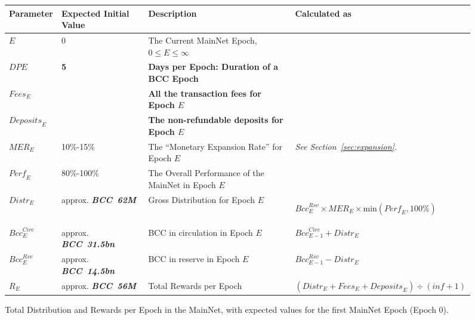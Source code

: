 \documentclass[11pt,a4paper,dvipsnames,twosided,final]{article}
\newcommand{\bcc}{BCC{}}
\newcommand{\BCC}[1]{\textbf{\emph{\bcc~{#1}}}}
\newcommand{\bcc}[1]{Bcc}
\begin{document}
\begin{figure}[h!]
\begin{center}
\begin{tabular}{||l|p{2.4cm}|p{6cm}|p{3.9cm}||}
  \hline \hline
\textbf{Parameter} & \textbf{Expected Initial Value} & \textbf{Description} & \textbf{Calculated as} \\\hline
$\textit{E}$ & $0$ & The Current MainNet Epoch, $0 \le E \le \infty$ & \\\hline
\textbf{\color{green} $\textit{DPE}$} & \textbf{\color{green} 5} & \textbf{\color{green} Days per Epoch: Duration of a \bcc{} Epoch} & \\\hline
\textbf{\color{cyan} $\textit{Fees}_E$} & & \textbf{\color{cyan} All the transaction fees for Epoch $E$} & \\\hline
\textbf{\color{cyan} $\textit{Deposits}_E$} & & \textbf{\color{cyan} The non-refundable deposits for Epoch $E$} & \\\hline
$\textit{MER}_E$ & 10\%-15\% &  The ``Monetary Expansion Rate'' for Epoch $E$ & \emph{See Section~\ref{sec:expansion}.} \\\hline
$\textit{Perf}_E$ & 80\%-100\% &  The Overall Performance of the MainNet in Epoch $E$ &  \\\hline
$\textit{Distr}_E$ & approx. \BCC{62M} & Gross Distribution for Epoch $E$ & \begin{flushleft}$\textit{Bcc}^{\textit{Rsv}}_E \times \textit{MER}_E \times \textrm{min}(\textit{Perf}_E, 100\%)$ \end{flushleft} \\\hline
$\textit{Bcc}^{\textit{Circ}}_E$ & approx. \BCC{31.5bn}  & \bcc{} in circulation in Epoch $E$ & $\textit{Bcc}^{\textit{Circ}}_{E-1} + \textit{Distr}_E$ \\\hline
$\textit{Bcc}^{\textit{Rsv}}_E$ & approx. \BCC{14.5bn} & \bcc{} in reserve in Epoch $E$ & $\textit{Bcc}^{\textit{Rsv}}_{E-1} - \textit{Distr}_E$ \\\hline
$R_E$ & approx. \BCC{56M} & Total Rewards per Epoch & $ (\textit{Distr}_E + \textit{Fees}_E + \textit{Deposits}_E) \div (\textit{inf}+1)$ \\\hline
  \hline
\end{tabular}
\end{center}
\caption{Total Distribution and Rewards per Epoch in the MainNet, with expected values for the first MainNet Epoch (Epoch 0).}
\end{figure}
\end{document}
